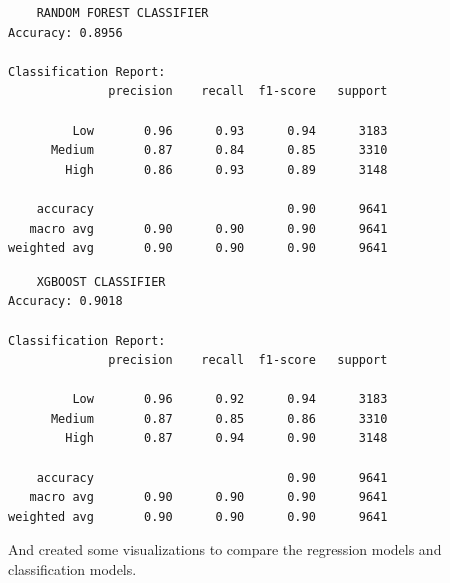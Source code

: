 \documentclass[12pt]{article}
\begin{document}
\begin{lstlisting}
    RANDOM FOREST CLASSIFIER
Accuracy: 0.8956

Classification Report:
              precision    recall  f1-score   support

         Low       0.96      0.93      0.94      3183
      Medium       0.87      0.84      0.85      3310
        High       0.86      0.93      0.89      3148

    accuracy                           0.90      9641
   macro avg       0.90      0.90      0.90      9641
weighted avg       0.90      0.90      0.90      9641

    \end{lstlisting}

\begin{lstlisting}
    XGBOOST CLASSIFIER
Accuracy: 0.9018

Classification Report:
              precision    recall  f1-score   support

         Low       0.96      0.92      0.94      3183
      Medium       0.87      0.85      0.86      3310
        High       0.87      0.94      0.90      3148

    accuracy                           0.90      9641
   macro avg       0.90      0.90      0.90      9641
weighted avg       0.90      0.90      0.90      9641
\end{lstlisting}

And created some visualizations to compare the regression models and classification models.
\end{document}
